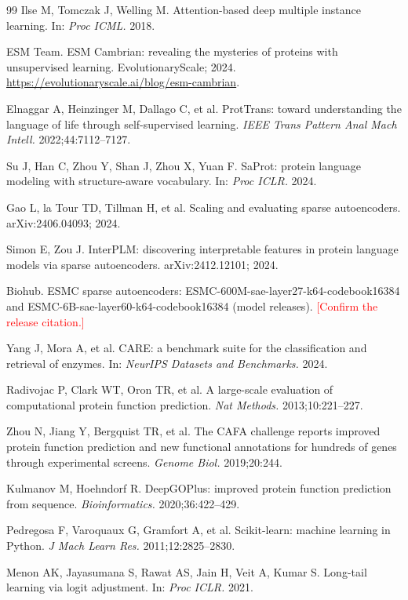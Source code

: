 \documentclass[11pt]{article}
\newcommand{\todo}[1]{\textcolor{red}{[#1]}}
\begin{document}
\begin{thebibliography}{99}
Ilse M, Tomczak J, Welling M. Attention-based deep multiple instance learning. In: \emph{Proc ICML.} 2018.

ESM Team. ESM Cambrian: revealing the mysteries of proteins with unsupervised learning. EvolutionaryScale; 2024.
\url{https://evolutionaryscale.ai/blog/esm-cambrian}.

Elnaggar A, Heinzinger M, Dallago C, et al. ProtTrans: toward understanding the language of life through
self-supervised learning. \emph{IEEE Trans Pattern Anal Mach Intell.} 2022;44:7112--7127.

Su J, Han C, Zhou Y, Shan J, Zhou X, Yuan F. SaProt: protein language modeling with structure-aware vocabulary. In:
\emph{Proc ICLR.} 2024.

Gao L, la Tour TD, Tillman H, et al. Scaling and evaluating sparse autoencoders. arXiv:2406.04093; 2024.

Simon E, Zou J. InterPLM: discovering interpretable features in protein language models via sparse autoencoders.
arXiv:2412.12101; 2024.

Biohub. ESMC sparse autoencoders: ESMC-600M-sae-layer27-k64-codebook16384 and ESMC-6B-sae-layer60-k64-codebook16384
(model releases). \todo{Confirm the release citation.}

Yang J, Mora A, et al. CARE: a benchmark suite for the classification and retrieval of enzymes. In: \emph{NeurIPS
Datasets and Benchmarks.} 2024.

Radivojac P, Clark WT, Oron TR, et al. A large-scale evaluation of computational protein function prediction.
\emph{Nat Methods.} 2013;10:221--227.

Zhou N, Jiang Y, Bergquist TR, et al. The CAFA challenge reports improved protein function prediction and new
functional annotations for hundreds of genes through experimental screens. \emph{Genome Biol.} 2019;20:244.

Kulmanov M, Hoehndorf R. DeepGOPlus: improved protein function prediction from sequence. \emph{Bioinformatics.}
2020;36:422--429.

Pedregosa F, Varoquaux G, Gramfort A, et al. Scikit-learn: machine learning in Python. \emph{J Mach Learn Res.}
2011;12:2825--2830.

Menon AK, Jayasumana S, Rawat AS, Jain H, Veit A, Kumar S. Long-tail learning via logit adjustment. In: \emph{Proc
ICLR.} 2021.


\end{thebibliography}
\end{document}
